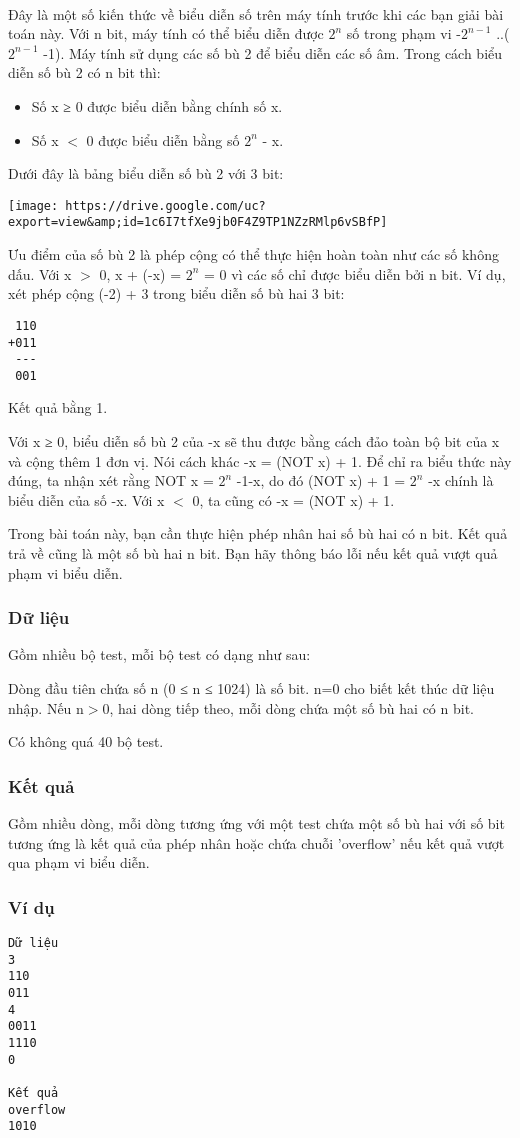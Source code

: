 

 

Đây là một số kiến thức về biểu diễn số trên máy tính trước khi các bạn giải bài toán này. Với n bit, máy tính có thể biểu diễn được $2^{n}$ số trong phạm vi -$2^{n-1}$ ..($2^{n-1}$ -1). Máy tính sử dụng các số bù 2 để biểu diễn các số âm. Trong cách biểu diễn số bù 2 có n bit thì:
\begin{itemize}
	\item Số x ≥ 0 được biểu diễn bằng chính số x.
	\item Số x $<$ 0 được biểu diễn bằng số $2^{n}$ - x.
\end{itemize}

Dưới đây là bảng biểu diễn số bù 2 với 3 bit:


\texttt{[image: https://drive.google.com/uc?export=view\&amp;id=1c6I7tfXe9jb0F4Z9TP1NZzRMlp6vSBfP]}

Ưu điểm của số bù 2 là phép cộng có thể thực hiện hoàn toàn như các số không dấu. Với x $>$ 0, x + (-x) = $2^{n}$ = 0 vì các số chỉ được biểu diễn bởi n bit. Ví dụ, xét phép cộng (-2) + 3 trong biểu diễn số bù hai 3 bit:
\begin{verbatim}
 110
+011
 ---
 001
\end{verbatim}

Kết quả bằng 1.

Với x ≥ 0, biểu diễn số bù 2 của -x sẽ thu được bằng cách đảo toàn bộ bit của x và cộng thêm 1 đơn vị. Nói cách khác -x = (NOT x) + 1. Để chỉ ra biểu thức này đúng, ta nhận xét rằng NOT x = $2^{n}$ -1-x, do đó (NOT x) + 1 = $2^{n}$ -x chính là biểu diễn của số -x. Với x $<$ 0, ta cũng có -x = (NOT x) + 1.

Trong bài toán này, bạn cần thực hiện phép nhân hai số bù hai có n bit. Kết quả trả về cũng là một số bù hai n bit. Bạn hãy thông báo lỗi nếu kết quả vượt quả phạm vi biểu diễn.

\subsubsection{Dữ liệu}

Gồm nhiều bộ test, mỗi bộ test có dạng như sau:

Dòng đầu tiên chứa số n (0 ≤ n ≤ 1024) là số bit. n=0 cho biết kết thúc dữ liệu nhập. Nếu n$>$0, hai dòng tiếp theo, mỗi dòng chứa một số bù hai có n bit.

Có không quá 40 bộ test.

\subsubsection{Kết quả}

Gồm nhiều dòng, mỗi dòng tương ứng với một test chứa một số bù hai với số bit tương ứng là kết quả của phép nhân hoặc chứa chuỗi 'overflow' nếu kết quả vượt qua phạm vi biểu diễn.

\subsubsection{Ví dụ}
\begin{verbatim}
Dữ liệu
3
110
011
4
0011
1110
0

Kết quả
overflow
1010
\end{verbatim}
